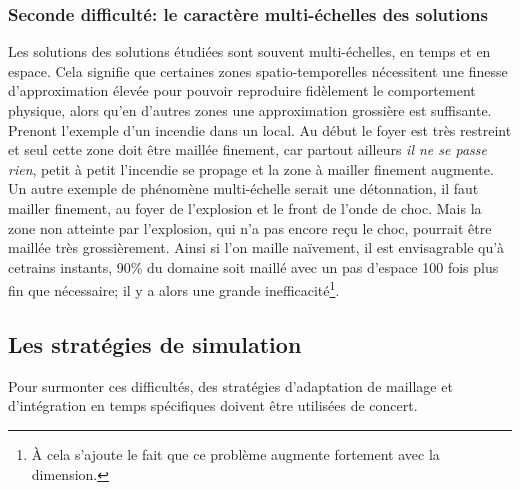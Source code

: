     \subsubsection{Seconde difficulté: le caractère multi-échelles des solutions}
        Les solutions des solutions étudiées sont souvent multi-échelles, en temps et en espace. Cela signifie que certaines zones spatio-temporelles nécessitent
        une finesse d'approximation élevée pour pouvoir reproduire fidèlement le comportement physique, alors qu'en d'autres zones une approximation
        grossière est suffisante. Prenont l'exemple d'un incendie dans un local. Au début le foyer est très restreint et seul cette zone doit être maillée finement, 
        car partout ailleurs \textit{il ne se passe rien}, petit à petit l'incendie se propage et la zone à mailler finement augmente. Un autre exemple de phénomène 
        multi-échelle serait une détonnation, il faut mailler finement, au foyer de l'explosion et le front de l'onde de choc. Mais la zone non atteinte par l'explosion, 
        qui n'a pas encore reçu le choc, pourrait être maillée très grossièrement. 
        Ainsi si l'on maille naïvement, il est envisagrable qu'à cetrains instants, 90\% du domaine soit maillé avec un pas d'espace 100 fois plus fin que nécessaire;
        il y a alors une grande inefficacité\footnote{À cela s'ajoute le fait que ce problème augmente fortement avec la dimension.}.


\subsection{Les stratégies de simulation}
    Pour surmonter ces difficultés, des stratégies d'adaptation de maillage et d'intégration en temps spécifiques doivent être utilisées de concert. 
